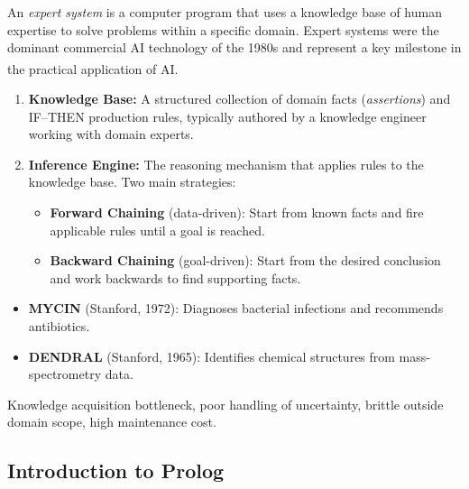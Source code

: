    \begin{tcbitemize}[ skin=sectionraster ]
        \tcbitem[title=Expert Systems Architecture, raster multicolumn=6]
        An \emph{expert system} is a computer program that uses a knowledge base of human expertise to solve problems within a specific domain. Expert systems were the dominant commercial AI technology of the 1980s and represent a key milestone in the practical application of AI\textsuperscript{\cite{hurbansGrokkingArtificialIntelligence2020}}.

        \begin{enumerate}
            \item \textbf{Knowledge Base:} A structured collection of domain facts (\emph{assertions}) and IF--THEN production rules, typically authored by a knowledge engineer working with domain experts.
            \item \textbf{Inference Engine:} The reasoning mechanism that applies rules to the knowledge base. Two main strategies:
            \begin{itemize}
                \item \textbf{Forward Chaining} (data-driven): Start from known facts and fire applicable rules until a goal is reached.
                \item \textbf{Backward Chaining} (goal-driven): Start from the desired conclusion and work backwards to find supporting facts.
            \end{itemize}
        \end{enumerate}

        \begin{itemize}
            \item \textbf{MYCIN} (Stanford, 1972): Diagnoses bacterial infections and recommends antibiotics.
            \item \textbf{DENDRAL} (Stanford, 1965): Identifies chemical structures from mass-spectrometry data.
        \end{itemize}

        Knowledge acquisition bottleneck, poor handling of uncertainty, brittle outside domain scope, high maintenance cost.
    \end{tcbitemize}

    \subsection{Introduction to Prolog}

